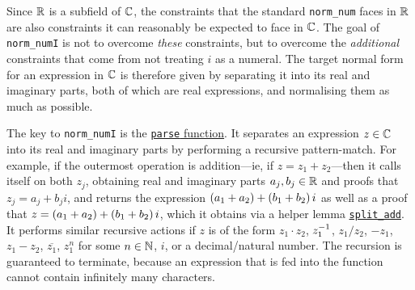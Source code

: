 Since $\mathbb{R}$ is a subfield of $\mathbb{C}$, the constraints that the standard \lstinline|norm_num| faces in $\mathbb{R}$ are also constraints it can reasonably be expected to face in $\mathbb{C}$. The goal of \lstinline|norm_numI| is not to overcome \textit{these} constraints, but to overcome the \textit{additional} constraints that come from not treating $i$ as a numeral. The target normal form for an expression in $\mathbb{C}$ is therefore given by separating it into its real and imaginary parts, both of which are real expressions, and normalising them as much as possible.

The key to \lstinline|norm_numI| is the \href{https://github.com/thefundamentaltheor3m/Sphere-Packing-Lean/blob/05f51ee8f61972da1b0a5ee360c4c57c1b599cca/SpherePacking/Tactic/NormNumI.lean#L72}{\lstinline|parse| function}. It separates an expression $z \in \mathbb{C}$ into its real and imaginary parts by performing a recursive pattern-match. For example, if the outermost operation is addition---ie, if $z = z_1 + z_2$---then it calls itself on both $z_j$, obtaining real and imaginary parts $a_j, b_j \in \mathbb{R}$ and proofs that $z_j = a_j + b_ji$, and returns the expression $\left( a_1 + a_2 \right) + \left( b_1 + b_2 \right)i$ as well as a proof that $z = \left( a_1 + a_2 \right) + \left( b_1 + b_2 \right)i$, which it obtains via a helper lemma \href{https://github.com/thefundamentaltheor3m/Sphere-Packing-Lean/blob/05f51ee8f61972da1b0a5ee360c4c57c1b599cca/SpherePacking/Tactic/NormNumI.lean#L20}{\lstinline|split_add|}. It performs similar recursive actions if $z$ is of the form $z_1 \cdot z_2$, $z_1^{-1}$, $z_1 / z_2$, $-z_1$, $z_1 - z_2$, $\overline{z_1}$, $z_1^n$ for some $n \in \mathbb{N}$, $i$, or a decimal/natural number. The recursion is guaranteed to terminate, because an expression that is fed into the function cannot contain infinitely many characters.


